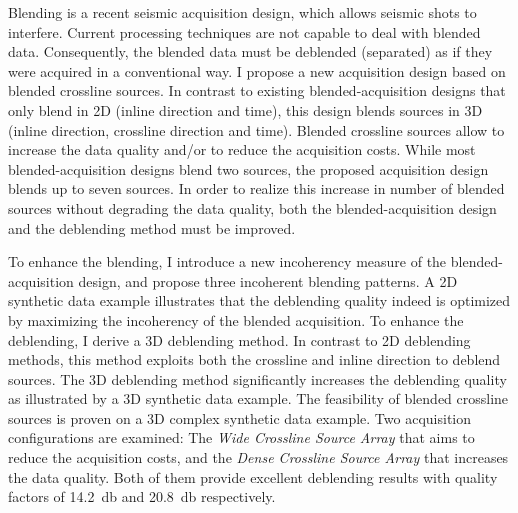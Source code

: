 \documentclass[a4paper,11pt]{mscThesis}
\begin{document}
%
\frontmatter %
%
    \maketitle
    
    \listoftodos
%
Blending is a recent seismic acquisition design, which allows seismic shots to interfere. %
Current processing techniques are not capable to deal with blended data. Consequently, the blended data must be deblended (separated) as if they were acquired in a conventional way.
I propose a new acquisition design  based on blended crossline sources. In contrast to existing blended-acquisition designs that only blend in 2D (inline direction and time), this design blends sources in 3D (inline direction, crossline direction and time). Blended crossline sources allow to increase the data quality and/or to reduce the acquisition costs. 
While most blended-acquisition designs blend two sources, the proposed acquisition design blends up to seven sources. In order to realize this increase in number of blended sources without degrading the data quality, both the blended-acquisition design and the deblending method must be improved.

To enhance the blending, I introduce a new incoherency measure of the blended-acquisition design, and propose three incoherent blending patterns. A 2D synthetic data example illustrates that the deblending quality indeed is optimized by maximizing the incoherency of the blended acquisition.
To enhance the deblending, I derive a 3D deblending method. In contrast to 2D deblending methods, this method exploits both the crossline and inline direction to deblend sources. The 3D deblending method significantly increases the deblending quality as illustrated by a 3D synthetic data example.
The feasibility of blended crossline sources is proven on a 3D complex synthetic data example. Two acquisition configurations are examined: The \textit{Wide Crossline Source Array} that aims to reduce the acquisition costs, and the \textit{Dense Crossline Source Array} that increases the data quality. Both of them provide excellent deblending results with quality factors of \SI{14.2}{\decibel} and \SI{20.8}{\decibel} respectively.

\end{document}

